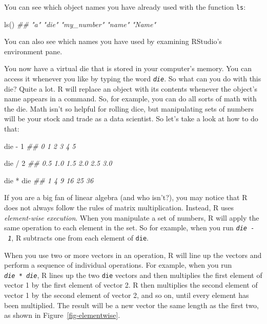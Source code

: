 \documentclass[
  letterpaper,
  DIV=11,
  numbers=noendperiod]{scrbook}
\newenvironment{Shaded}{\begin{snugshade}}{\end{snugshade}}
\newcommand{\DecValTok}[1]{\textcolor[rgb]{0.68,0.00,0.00}{#1}}
\newcommand{\DocumentationTok}[1]{\textcolor[rgb]{0.37,0.37,0.37}{\textit{#1}}}
\newcommand{\FunctionTok}[1]{\textcolor[rgb]{0.28,0.35,0.67}{#1}}
\newcommand{\NormalTok}[1]{\textcolor[rgb]{0.00,0.23,0.31}{#1}}
\newcommand{\SpecialCharTok}[1]{\textcolor[rgb]{0.37,0.37,0.37}{#1}}
\begin{document}
You can see which object names you have already used with the function
\texttt{ls}:

\begin{Shaded}
\begin{Highlighting}[]
\FunctionTok{ls}\NormalTok{()}
\DocumentationTok{\#\# "a"         "die"       "my\_number" "name"     "Name"     }
\end{Highlighting}
\end{Shaded}

You can also see which names you have used by examining RStudio's
environment pane.

You now have a virtual die that is stored in your computer's memory. You
can access it whenever you like by typing the word \emph{\texttt{die}}.
So what can you do with this die? Quite a lot. R will replace an object
with its contents whenever the object's name appears in a command. So,
for example, you can do all sorts of math with the die. Math isn't so
helpful for rolling dice, but manipulating sets of numbers will be your
stock and trade as a data scientist. So let's take a look at how to do
that:

\begin{Shaded}
\begin{Highlighting}[]
\NormalTok{die }\SpecialCharTok{{-}} \DecValTok{1}
\DocumentationTok{\#\# 0 1 2 3 4 5}

\NormalTok{die }\SpecialCharTok{/} \DecValTok{2}
\DocumentationTok{\#\# 0.5 1.0 1.5 2.0 2.5 3.0}

\NormalTok{die }\SpecialCharTok{*}\NormalTok{ die}
\DocumentationTok{\#\# 1  4  9 16 25 36}
\end{Highlighting}
\end{Shaded}

If you are a big fan of linear algebra (and who isn't?), you may notice
that R does not always follow the rules of matrix multiplication.
Instead, R uses \emph{element-wise execution}. When you manipulate a set
of numbers, R will apply the same operation to each element in the set.
So for example, when you run \emph{\texttt{die\ -\ 1}}, R subtracts one
from each element of \texttt{die}.

When you use two or more vectors in an operation, R will line up the
vectors and perform a sequence of individual operations. For example,
when you run \emph{\texttt{die\ *\ die}}, R lines up the two
\texttt{die} vectors and then multiplies the first element of vector 1
by the first element of vector 2. R then multiplies the second element
of vector 1 by the second element of vector 2, and so on, until every
element has been multiplied. The result will be a new vector the same
length as the first two, as shown in Figure~\ref{fig-elementwise}.
\end{document}
